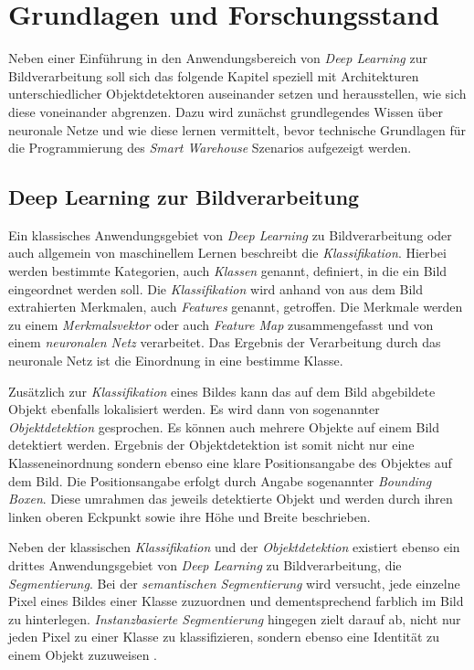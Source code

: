 \chapter{Grundlagen und Forschungsstand}

Neben einer Einführung in den Anwendungsbereich von \textit{Deep Learning} zur Bildverarbeitung soll sich das folgende Kapitel speziell mit Architekturen unterschiedlicher Objektdetektoren auseinander setzen und herausstellen, wie sich diese voneinander abgrenzen. Dazu wird zunächst grundlegendes Wissen über neuronale Netze und wie diese \glqq lernen\grqq{} vermittelt, bevor technische Grundlagen für die Programmierung des \textit{Smart Warehouse} Szenarios aufgezeigt werden.

\section{Deep Learning zur Bildverarbeitung}

Ein klassisches Anwendungsgebiet von \textit{Deep Learning} zu Bildverarbeitung oder auch allgemein von maschinellem Lernen beschreibt die \textit{Klassifikation}. Hierbei werden bestimmte Kategorien, auch \textit{Klassen} genannt, definiert, in die ein Bild eingeordnet werden soll. Die \textit{Klassifikation} wird anhand von aus dem Bild extrahierten Merkmalen, auch \textit{Features} genannt, getroffen. Die Merkmale werden zu einem \textit{Merkmalsvektor} oder auch \textit{Feature Map} zusammengefasst und von einem \textit{neuronalen Netz} verarbeitet. Das Ergebnis der Verarbeitung durch das neuronale Netz ist die Einordnung in eine bestimme Klasse. 

Zusätzlich zur \textit{Klassifikation} eines Bildes kann das auf dem Bild abgebildete Objekt ebenfalls lokalisiert werden. Es wird dann von sogenannter \textit{Objektdetektion} gesprochen. Es können auch mehrere Objekte auf einem Bild detektiert werden. Ergebnis der Objektdetektion ist somit nicht nur eine Klasseneinordnung sondern ebenso eine klare Positionsangabe des Objektes auf dem Bild. Die Positionsangabe erfolgt durch Angabe sogenannter \textit{Bounding Boxen}. Diese umrahmen das jeweils detektierte Objekt und werden durch ihren linken oberen Eckpunkt sowie ihre Höhe und Breite beschrieben. 

Neben der klassischen \textit{Klassifikation} und der \textit{Objektdetektion} existiert ebenso ein drittes Anwendungsgebiet von \textit{Deep Learning} zu Bildverarbeitung, die \textit{Segmentierung}. Bei der \textit{semantischen Segmentierung} wird versucht, jede einzelne Pixel eines Bildes einer Klasse zuzuordnen und dementsprechend farblich im Bild zu hinterlegen. \textit{Instanzbasierte Segmentierung} hingegen zielt darauf ab, nicht nur jeden Pixel zu einer Klasse zu klassifizieren, sondern ebenso eine Identität zu einem Objekt zuzuweisen \cite{RavindraParmar.20180902}. 

